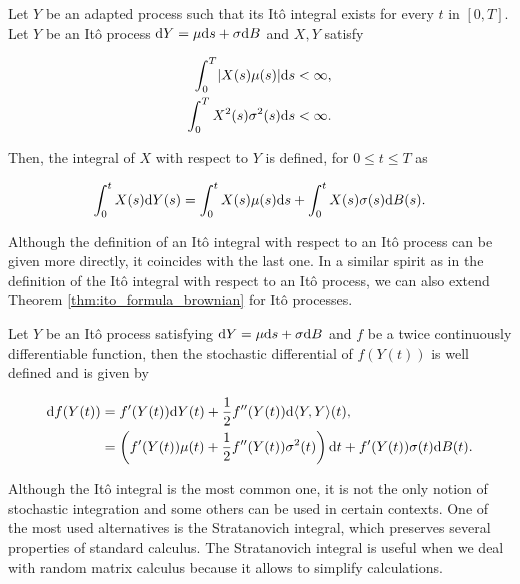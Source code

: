  \begin{definition}
    Let $Y$ be an adapted process such that its Itô integral exists for every $t$ in $[0,T]$. Let $Y$ be an Itô process $\mathrm d Y = \mu \mathrm d s + \sigma \mathrm d B$ and $X, Y$ satisfy

    \begin{align*}
        \int_0^T \lvert  X(s) \mu(s) \rvert \mathrm d s &< \infty,\\
        \int_0^T X^2(s)\sigma^2(s) \mathrm d s & < \infty.
    \end{align*}

    Then, the integral of $X$ with respect to $Y$ is defined, for $0 \le t \le T$ as

    \begin{equation*}
        \int_0^t X(s) \mathrm d Y(s) = \int_0^t X(s) \mu(s) \mathrm d s + \int_0^t X(s) \sigma(s) \mathrm d B(s).
    \end{equation*}

 \end{definition}

 Although the definition of an Itô integral with respect to an Itô process can be given more directly, it coincides with the last one. In a similar spirit as in the definition of the Itô integral with respect to an Itô process, we can also extend Theorem \ref{thm:ito_formula_brownian} for Itô processes.

 \begin{theorem}
    Let $Y$ be an Itô process satisfying $\mathrm d Y = \mu \mathrm d s + \sigma \mathrm d B$ and $f$ be a twice continuously differentiable function, then the stochastic differential of $f(Y(t))$ is well defined and is given by

    \begin{align*}
        \mathrm d f(Y(t)) &= f'(Y(t))\mathrm d Y(t) + \frac12 f''(Y(t)) \mathrm d \langle Y, Y\rangle (t),\\ 
        &= \left( f'(Y(t)) \mu(t) + \frac12 f''(Y(t)) \sigma^2(t) \right)\mathrm d t + f'(Y(t))\sigma(t) \mathrm d B(t).
    \end{align*}
\end{theorem}

Although the Itô integral is the most common one, it is not the only notion of stochastic integration and some others can be used in certain contexts. One of the most used alternatives is the Stratanovich integral, which preserves several properties of standard calculus. The Stratanovich integral is useful when we deal with random matrix calculus because it allows to simplify calculations.


